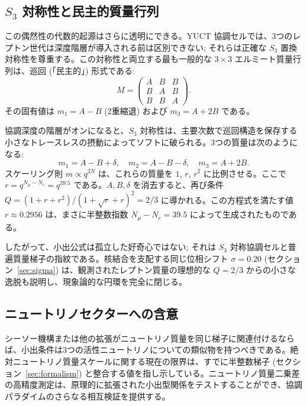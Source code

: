 \documentclass[11pt,a4paper]{article}
\theoremstyle{remark}
\begin{document}
	\subsection{\(S_3\) 対称性と民主的質量行列}
	
	この偶然性の代数的起源はさらに透明にできる。YUCT 協調セルでは、3つのレプトン世代は深度階層が導入される前は区別できない; それらは正確な \(S_3\) 置換対称性を尊重する。この対称性と両立する最も一般的な \(3\times3\) エルミート質量行列は、巡回 (「民主的」) 形式である:
	\begin{equation}
		M = \begin{pmatrix}
			A & B & B \\
			B & A & B \\
			B & B & A
		\end{pmatrix}.
		\label{eq:democratic}
	\end{equation}
	その固有値は \(m_1 = A - B\) (2重縮退) および \(m_3 = A + 2B\) である。
	
	協調深度の階層がオンになると、\(S_3\) 対称性は、主要次数で巡回構造を保存する小さなトレースレスの摂動によってソフトに破られる。3つの質量は次のようになる:
	\begin{equation}
		m_1 = A - B + \delta,\quad
		m_2 = A - B - \delta,\quad
		m_3 = A + 2B.
	\end{equation}
	スケーリング則 \(m \propto q^{2N}\) は、これらの質量を \(1\), \(r\), \(r^2\) に比例させる。ここで \(r = q^{N_\mu - N_e} = q^{39.5}\) である。\(A,B,\delta\) を消去すると、再び条件 \(Q = (1+r+r^2)/(1+\sqrt{r}+r)^2 = 2/3\) に導かれる。この方程式を満たす値 \(r \approx 0.2956\) は、まさに半整数指数 \(N_\mu - N_e = 39.5\) によって生成されたものである。
	
	したがって、小出公式は孤立した好奇心ではない; それは \(S_3\) 対称協調セルと普遍質量梯子の指紋である。核結合を支配する同じ位相シフト \(\sigma = 0.20\) (セクション~\ref{sec:sigma}) は、観測されたレプトン質量の理想的な \(Q = 2/3\) からの小さな逸脱も説明し、現象論的な円環を完全に閉じる。
	
	\subsection{ニュートリノセクターへの含意}
	
	シーソー機構または他の拡張がニュートリノ質量を同じ梯子に関連付けるならば、小出条件は3つの活性ニュートリノについての類似物を持つべきである。絶対ニュートリノ質量スケールに関する現在の限界は、すでに半整数梯子 (セクション~\ref{sec:formalism}) と整合する値を指し示している。ニュートリノ質量二乗差の高精度測定は、原理的に拡張された小出型関係をテストすることができ、協調パラダイムのさらなる相互検証を提供する。
	
\end{document}
